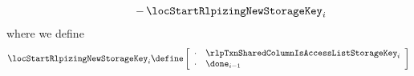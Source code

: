 \begin{description}
\begin{description}
\[\begin{array}{lcl}
						&   & \qquad - \, \locStartRlpizingNewStorageKey _{i}     \\
					\end{array}
				\]
				where we define
				\[
					\locStartRlpizingNewStorageKey _{i} \define
					\left[ \begin{array}{cl}
						\cdot & \rlpTxnSharedColumnIsAccessListStorageKey _{i} \\
						\cdot & \done _{i - 1}                                 \\
					\end{array} \right]
				\]
		\end{description}
	\end{description}
